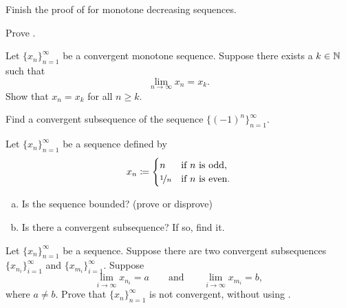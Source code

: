 \begin{exercise}
Finish the proof of  for monotone decreasing
sequences.
\end{exercise}

\begin{exercise}
Prove .
\end{exercise}

\begin{exercise}
Let $\{ x_n \}_{n=1}^\infty$ be a convergent monotone sequence.  Suppose 
there exists a $k \in {\mathbb{N}}$ such that
\begin{equation*}
\lim_{n\to \infty} x_n = x_k .
\end{equation*}
Show that $x_n = x_k$ for all $n \geq k$.
\end{exercise}

\begin{exercise}
\pagebreak[2]
Find a convergent subsequence of the sequence
$\bigl\{ {(-1)}^n \bigr\}_{n=1}^\infty$.
\end{exercise}

\begin{exercise}
Let $\{x_n\}_{n=1}^\infty$ be a sequence defined by
\begin{equation*}
x_n \coloneqq 
\begin{cases}
n               & \text{if } n \text{ is odd} , \\
\nicefrac{1}{n} & \text{if } n \text{ is even} .
\end{cases}
\avoidbreak
\end{equation*}
\begin{enumerate}[a)]
\item Is the sequence bounded? (prove or disprove)
\item Is there a convergent subsequence?  If so, find it.
\end{enumerate}
\end{exercise}

\begin{exercise}
\pagebreak[2]
Let $\{ x_n \}_{n=1}^\infty$ be a sequence.
Suppose there are two convergent subsequences $\{ x_{n_i} \}_{i=1}^\infty$ and
$\{ x_{m_i} \}_{i=1}^\infty$.  Suppose 
\begin{equation*}
\lim_{i\to\infty} x_{n_i} = a
\qquad \text{and} \qquad
\lim_{i\to\infty} x_{m_i} = b,
\end{equation*}
where $a \neq b$.  Prove that $\{ x_n \}_{n=1}^\infty$ is not convergent, without
using .
\end{exercise}

